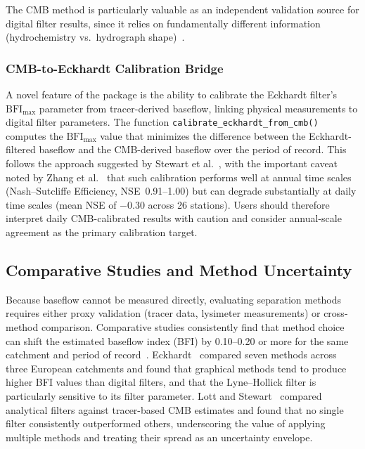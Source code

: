 \documentclass[hydrology,article,submit,pdftex,moreauthors]{Definitions/mdpi}
\begin{document}
The CMB method is particularly valuable as an independent validation source for digital filter results, since it relies on fundamentally different information (hydrochemistry vs.\ hydrograph shape)~\cite{Lott2016}.

\subsubsection{CMB-to-Eckhardt Calibration Bridge}

A novel feature of the package is the ability to calibrate the Eckhardt filter's $\mathrm{BFI_{max}}$ parameter from tracer-derived baseflow, linking physical measurements to digital filter parameters. The function \texttt{calibrate\_eckhardt\_from\_cmb()} computes the $\mathrm{BFI_{max}}$ value that minimizes the difference between the Eckhardt-filtered baseflow and the CMB-derived baseflow over the period of record. This follows the approach suggested by Stewart et al.~\cite{Stewart2007}, with the important caveat noted by Zhang et al.~\cite{Zhang2021} that such calibration performs well at annual time scales (Nash--Sutcliffe Efficiency, NSE~0.91--1.00) but can degrade substantially at daily time scales (mean NSE of $-0.30$ across 26 stations). Users should therefore interpret daily CMB-calibrated results with caution and consider annual-scale agreement as the primary calibration target.

\subsection{Comparative Studies and Method Uncertainty}
\label{sec:comparative}

Because baseflow cannot be measured directly, evaluating separation methods requires either proxy validation (tracer data, lysimeter measurements) or cross-method comparison. Comparative studies consistently find that method choice can shift the estimated baseflow index (BFI) by 0.10--0.20 or more for the same catchment and period of record~\cite{Eckhardt2008,Lott2016}. Eckhardt~\cite{Eckhardt2008} compared seven methods across three European catchments and found that graphical methods tend to produce higher BFI values than digital filters, and that the Lyne--Hollick filter is particularly sensitive to its filter parameter. Lott and Stewart~\cite{Lott2016} compared analytical filters against tracer-based CMB estimates and found that no single filter consistently outperformed others, underscoring the value of applying multiple methods and treating their spread as an uncertainty envelope.
\end{document}
